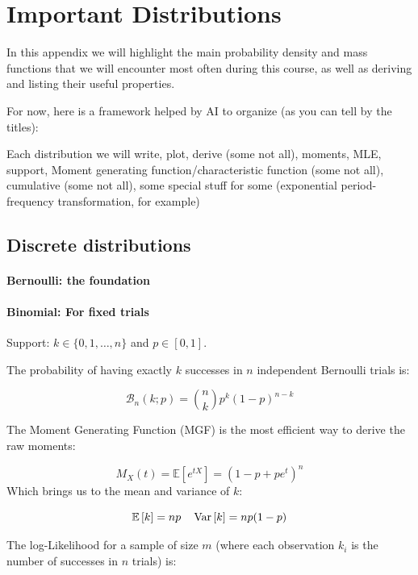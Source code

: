 \chapter{Important Distributions}
In this appendix we will highlight the main probability density and mass functions that we will encounter most often during this course, as well as deriving and listing their useful properties. 

For now, here is a framework helped by AI to organize (as you can tell by the titles):

Each distribution we will write, plot, derive (some not all), moments, MLE, support, Moment generating function/characteristic function (some not all), cumulative (some not all), some special stuff for some (exponential period-frequency transformation, for example)

\section{Discrete distributions}
\subsubsection{Bernoulli: the foundation} %

\subsubsection{Binomial: For fixed trials}
Support: $k \in \{0, 1, \dots, n\}$ and $p \in [0, 1]$.

The probability of having exactly $k$ successes in $n$ independent Bernoulli trials is:

\begin{equation}
	\mathcal{B}_n(k;p) = \binom{n}{k}p^k\left(1-p\right)^{n-k}
\tag{Binomial pmf}
\label{pmf:binom}
\end{equation}

The Moment Generating Function (MGF) is the most efficient way to derive the raw moments:

	\[
	M_X(t) = \mathbb{E}[e^{tX}] = (1 - p + pe^t)^n
	\]
Which brings us to the mean and variance of $k$:

	\[
	\mathbb{E}\left[k\right] = np \quad \operatorname{Var}\left[k\right] = np(1-p)
	\]

The log-Likelihood for a sample of size $m$ (where each observation $k_i$ is the number of successes in $n$ trials) is:

